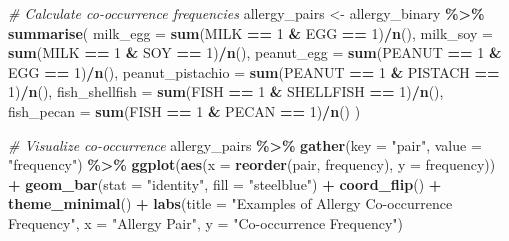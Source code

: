 \documentclass[
]{article}
\newenvironment{Shaded}{\begin{snugshade}}{\end{snugshade}}
\newcommand{\AttributeTok}[1]{\textcolor[rgb]{0.13,0.29,0.53}{#1}}
\newcommand{\CommentTok}[1]{\textcolor[rgb]{0.56,0.35,0.01}{\textit{#1}}}
\newcommand{\DecValTok}[1]{\textcolor[rgb]{0.00,0.00,0.81}{#1}}
\newcommand{\FunctionTok}[1]{\textcolor[rgb]{0.13,0.29,0.53}{\textbf{#1}}}
\newcommand{\NormalTok}[1]{#1}
\newcommand{\OtherTok}[1]{\textcolor[rgb]{0.56,0.35,0.01}{#1}}
\newcommand{\SpecialCharTok}[1]{\textcolor[rgb]{0.81,0.36,0.00}{\textbf{#1}}}
\newcommand{\StringTok}[1]{\textcolor[rgb]{0.31,0.60,0.02}{#1}}
\begin{document}
\begin{Shaded}
\begin{Highlighting}[]
\CommentTok{\# Calculate co{-}occurrence frequencies}
\NormalTok{allergy\_pairs }\OtherTok{\textless{}{-}}\NormalTok{ allergy\_binary }\SpecialCharTok{\%\textgreater{}\%}
  \FunctionTok{summarise}\NormalTok{(}
    \AttributeTok{milk\_egg =} \FunctionTok{sum}\NormalTok{(MILK }\SpecialCharTok{==} \DecValTok{1} \SpecialCharTok{\&}\NormalTok{ EGG }\SpecialCharTok{==} \DecValTok{1}\NormalTok{)}\SpecialCharTok{/}\FunctionTok{n}\NormalTok{(),}
    \AttributeTok{milk\_soy =} \FunctionTok{sum}\NormalTok{(MILK }\SpecialCharTok{==} \DecValTok{1} \SpecialCharTok{\&}\NormalTok{ SOY }\SpecialCharTok{==} \DecValTok{1}\NormalTok{)}\SpecialCharTok{/}\FunctionTok{n}\NormalTok{(),}
    \AttributeTok{peanut\_egg =} \FunctionTok{sum}\NormalTok{(PEANUT }\SpecialCharTok{==} \DecValTok{1} \SpecialCharTok{\&}\NormalTok{ EGG }\SpecialCharTok{==} \DecValTok{1}\NormalTok{)}\SpecialCharTok{/}\FunctionTok{n}\NormalTok{(),}
    \AttributeTok{peanut\_pistachio =} \FunctionTok{sum}\NormalTok{(PEANUT }\SpecialCharTok{==} \DecValTok{1} \SpecialCharTok{\&}\NormalTok{ PISTACH }\SpecialCharTok{==} \DecValTok{1}\NormalTok{)}\SpecialCharTok{/}\FunctionTok{n}\NormalTok{(),}
    \AttributeTok{fish\_shellfish =} \FunctionTok{sum}\NormalTok{(FISH }\SpecialCharTok{==} \DecValTok{1} \SpecialCharTok{\&}\NormalTok{ SHELLFISH }\SpecialCharTok{==} \DecValTok{1}\NormalTok{)}\SpecialCharTok{/}\FunctionTok{n}\NormalTok{(),}
    \AttributeTok{fish\_pecan =} \FunctionTok{sum}\NormalTok{(FISH }\SpecialCharTok{==} \DecValTok{1} \SpecialCharTok{\&}\NormalTok{ PECAN }\SpecialCharTok{==} \DecValTok{1}\NormalTok{)}\SpecialCharTok{/}\FunctionTok{n}\NormalTok{()}
\NormalTok{  )}

\CommentTok{\# Visualize co{-}occurrence}
\NormalTok{allergy\_pairs }\SpecialCharTok{\%\textgreater{}\%}
  \FunctionTok{gather}\NormalTok{(}\AttributeTok{key =} \StringTok{"pair"}\NormalTok{, }\AttributeTok{value =} \StringTok{"frequency"}\NormalTok{) }\SpecialCharTok{\%\textgreater{}\%}
  \FunctionTok{ggplot}\NormalTok{(}\FunctionTok{aes}\NormalTok{(}\AttributeTok{x =} \FunctionTok{reorder}\NormalTok{(pair, frequency), }\AttributeTok{y =}\NormalTok{ frequency)) }\SpecialCharTok{+}
  \FunctionTok{geom\_bar}\NormalTok{(}\AttributeTok{stat =} \StringTok{"identity"}\NormalTok{, }\AttributeTok{fill =} \StringTok{"steelblue"}\NormalTok{) }\SpecialCharTok{+}
  \FunctionTok{coord\_flip}\NormalTok{() }\SpecialCharTok{+}
  \FunctionTok{theme\_minimal}\NormalTok{() }\SpecialCharTok{+}
  \FunctionTok{labs}\NormalTok{(}\AttributeTok{title =} \StringTok{"Examples of Allergy Co{-}occurrence Frequency"}\NormalTok{,}
       \AttributeTok{x =} \StringTok{"Allergy Pair"}\NormalTok{,}
       \AttributeTok{y =} \StringTok{"Co{-}occurrence Frequency"}\NormalTok{)}
\end{Highlighting}
\end{Shaded}
\end{document}
